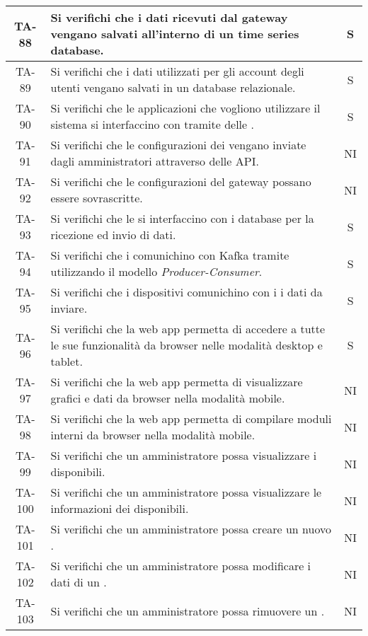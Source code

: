 \begin{center}
\begin{longtable}{|c|p{10cm}|c|}
			 \hline
			 TA-88 & Si verifichi che i dati ricevuti dal gateway vengano salvati all'interno di un time series database. & S \\
			 \hline
			 TA-89 & Si verifichi che i dati utilizzati per gli account degli utenti vengano salvati in un database relazionale. & S \\
			 \hline
			 TA-90 & Si verifichi che le applicazioni che vogliono utilizzare il sistema si interfaccino con \glock{Kafka} tramite delle \glock{API}. & S \\
			 \hline
			 TA-91 & Si verifichi che le configurazioni dei \glock{gateway} vengano inviate dagli amministratori attraverso delle API. & NI \\
			 \hline
			 TA-92 & Si verifichi che le configurazioni del gateway possano essere sovrascritte. & NI \\
			 \hline
			 TA-93 & Si verifichi che le \glock{API} si interfaccino con i database per la ricezione ed invio di dati. & S \\
			 \hline
			 TA-94 & Si verifichi che i \glock{gateway} comunichino con Kafka tramite \glock{topic} utilizzando il modello \textit{Producer-Consumer}. & S \\
			 \hline
			 TA-95 & Si verifichi che i dispositivi comunichino con i \glock{gateway} i dati da inviare. & S \\
			 \hline
			 TA-96 & Si verifichi che la web app permetta di accedere a tutte le sue funzionalità da browser nelle modalità desktop e tablet. & S \\
			 \hline
			 TA-97 & Si verifichi che la web app permetta di visualizzare grafici e dati da browser nella modalità mobile. & NI \\
			 \hline
			 TA-98 & Si verifichi che la web app permetta di compilare moduli interni da browser nella modalità mobile. & NI \\
			 \hline
			 TA-99 & Si verifichi che un amministratore possa visualizzare i \glock{gateway} disponibili. & NI \\
			 \hline
			 TA-100 & Si verifichi che un amministratore possa visualizzare le informazioni dei \glock{gateway} disponibili. & NI \\
			 \hline
			 TA-101 & Si verifichi che un amministratore possa creare un nuovo \glock{gateway}. & NI \\
			 \hline
			 TA-102 & Si verifichi che un amministratore possa modificare i dati di un \glock{gateway}. & NI \\
			 \hline
			 TA-103 & Si verifichi che un amministratore possa rimuovere un \glock{gateway}. & NI \\

\end{longtable}
\end{center}
